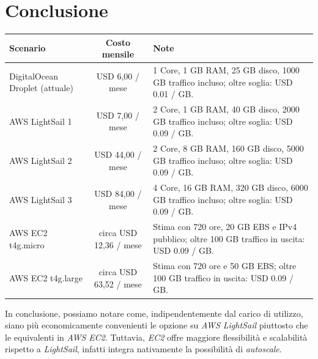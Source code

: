 \documentclass[10pt, letterpaper]{article}
\begin{document}
\section{Conclusione}
\begin{center}
    \begin{tabularx}{\textwidth}{|l|c|X|}
        \hline
        \rowcolor{lightgray} \textbf{Scenario} & \textbf{Costo mensile} & \textbf{Note} \\
        \hline
        DigitalOcean Droplet (attuale) & USD 6,00 / mese & 1 Core, 1 GB RAM, 25 GB disco, 1000 GB traffico incluso; oltre soglia: USD 0.01 / GB. \\
        \hline
        AWS LightSail 1 & USD 7,00 / mese & 2 Core, 1 GB RAM, 40 GB disco, 2000 GB traffico incluso; oltre soglia: USD 0.09 / GB. \\
        \hline
        AWS LightSail 2 & USD 44,00 / mese & 2 Core, 8 GB RAM, 160 GB disco, 5000 GB traffico incluso; oltre soglia: USD 0.09 / GB. \\
        \hline
        AWS LightSail 3 & USD 84,00 / mese & 4 Core, 16 GB RAM, 320 GB disco, 6000 GB traffico incluso; oltre soglia: USD 0.09 / GB. \\
        \hline
        AWS EC2 t4g.micro & circa USD 12,36 / mese & Stima con 720 ore, 20 GB EBS e IPv4 pubblico; oltre 100 GB traffico in uscita: USD 0.09 / GB. \\
        \hline
        AWS EC2 t4g.large & circa USD 63,52 / mese & Stima con 720 ore e 50 GB EBS; oltre 100 GB traffico in uscita: USD 0.09 / GB. \\
        \hline
    \end{tabularx}
\end{center}

In conclusione, possiamo notare come, indipendentemente dal carico di utilizzo, siano più economicamente convenienti le opzione su \textit{AWS LightSail} piuttosto che le equivalenti in \textit{AWS EC2}. Tuttavia, \textit{EC2} offre maggiore flessibilità e scalabilità rispetto a \textit{LightSail}, infatti integra nativamente la possibilità di \textit{autoscale}.
\end{document}

